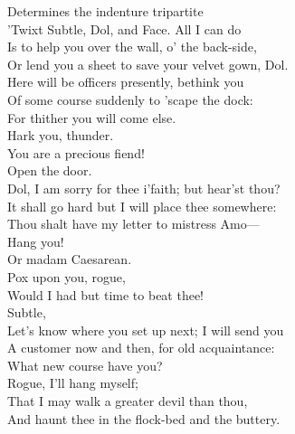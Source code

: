\documentclass[a4paper,oneside]{memoir}
\begin{document}
\begin{drama*}
Determines the indenture tripartite\\
'Twixt Subtle, Dol, and Face. All I can do\\
Is to help you over the wall, o' the back-side,\\
Or lend you a sheet to save your velvet gown, Dol.\\
Here will be officers presently, bethink you\\
Of some course suddenly to 'scape the dock:\\
For thither you will come else.\\
 Hark you, thunder.\\
\subtlespeaks You are a precious fiend!\\
\officeronespeaks {}  Open the door.\\
\facespeaks Dol, I am sorry for thee i'faith; but hear'st thou?\\
It shall go hard but I will place thee somewhere:\\
Thou shalt have my letter to mistress Amo---\\
\dolspeaks Hang you!\\
\facespeaks {} Or madam Caesarean.\\
\dolspeaks {} Pox upon you, rogue,\\
Would I had but time to beat thee!\\
\facespeaks {} Subtle,\\
Let's know where you set up next; I will send you\\
A customer now and then, for old acquaintance:\\
What new course have you?\\
\subtlespeaks {} Rogue, I'll hang myself;\\
That I may walk a greater devil than thou,\\
And haunt thee in the flock-bed and the buttery.\\
\scene


\end{drama*}
\end{document}
